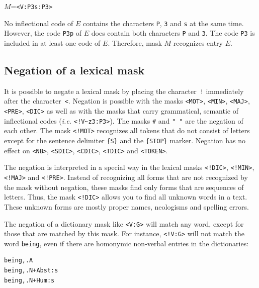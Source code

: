 $M$=\verb$<V:P3s:P3>$

\bigskip
\noindent No inflectional code of $E$ contains the characters \verb+P+,
\verb+3+ and \verb+s+ at the same time. However, the code \verb+P3p+ of $E$
does contain both characters \verb+P+ and \verb+3+. The code \verb+P3+ is
included in at least one code of $E$. Therefore, mask $M$ recognizes entry $E$.

\subsection{Negation of a lexical mask}
It is possible to negate a lexical mask by placing the character~\verb+!+ immediately
after the character~\verb+<+.
Negation is possible with the masks \verb+<MOT>+, \verb+<MIN>+, \verb+<MAJ>+,
\verb+<PRE>+, \verb+<DIC>+ as well as with the masks that carry grammatical,
semantic of inflectional codes (\textit{i.e.} \verb$<!V~z3:P3>$).
The masks \verb+#+ and \verb+" "+ are the negation of each other.
\index{\verb+#+} The
mask \verb$<!MOT>$ recognizes all tokens that do not consist of
letters except for the sentence delimiter \verb+{S}+ and the \verb+{STOP}+ marker.
Negation has no effect on \verb+<NB>+, \verb+<SDIC>+, \verb+<CDIC>+, \verb+<TDIC>+ and \verb+<TOKEN>+.

\bigskip
\noindent The negation is interpreted in a special way in the lexical masks
\verb+<!DIC>+, \verb+<!MIN>+, \verb+<!MAJ>+ and \verb+<!PRE>+.
Instead of recognizing all forms that are not recognized by the mask without
negation, these masks find only forms that are sequences of letters.
Thus, the mask \verb+<!DIC>+ allows you to find all unknown words in a text.
These unknown forms are mostly proper names, neologisms and spelling errors.

\bigskip
\noindent The negation of a dictionary mask like \verb+<V:G>+ will match any
word, except for those that are matched by this mask. For instance, \verb+<!V:G>+ will not
match the word \verb+being+, even if there are homonymic non-verbal entries in
the dictionaries:


\begin{verbatim}
being,.A
being,.N+Abst:s
being,.N+Hum:s
\end{verbatim}

